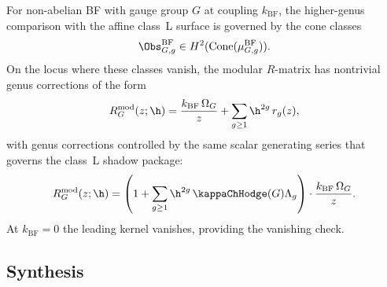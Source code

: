 \begin{remark}
For non-abelian BF with gauge group $G$ at coupling $k_{\mathrm{BF}}$,
the higher-genus comparison with the affine class~L surface is governed by
the cone classes
\[
\Obs^{\mathrm{BF}}_{G,g}\in H^2(\Cone(\mu^{\mathrm{BF}}_{G,g})).
\]
On the locus where these classes vanish, the modular $R$-matrix has
nontrivial genus corrections of the form
\[
R^{\mathrm{mod}}_{G}(z; \h) = \frac{k_{\mathrm{BF}}\,\Omega_G}{z} + \sum_{g \geq 1} \h^{2g}\,r_g(z),
\]
with genus corrections controlled by the same scalar generating series that
governs the class~L shadow package:
\[
R^{\mathrm{mod}}_G(z; \h)
= \left(1 + \sum_{g \geq 1} \h^{2g}\, \kappaChHodge(G) \Lambda_g\right)
\cdot \frac{k_{\mathrm{BF}}\,\Omega_G}{z}.
\]
At $k_{\mathrm{BF}} = 0$ the leading kernel vanishes, providing the vanishing check.
\end{remark}

\subsection{Synthesis}

